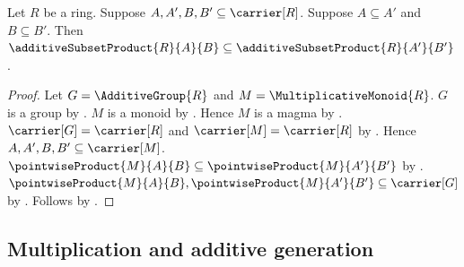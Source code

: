 \begin{proposition}\label{additive_subset_product_monotone}
    Let $R$ be a ring.
    Suppose $A,A',B,B'\subseteq\carrier[R]$.
    Suppose $A\subseteq A'$ and $B\subseteq B'$.
    Then $\additiveSubsetProduct{R}{A}{B}
        \subseteq\additiveSubsetProduct{R}{A'}{B'}$.
\end{proposition}
\begin{proof}
    Let $G=\AdditiveGroup{R}$ and $M=\MultiplicativeMonoid{R}$.
    $G$ is a group by .
    $M$ is a monoid by .
    Hence $M$ is a magma by .
    $\carrier[G]=\carrier[R]$ and $\carrier[M]=\carrier[R]$ by
        .
    Hence $A,A',B,B'\subseteq\carrier[M]$.
    $\pointwiseProduct{M}{A}{B}
        \subseteq\pointwiseProduct{M}{A'}{B'}$ by
        .
    $\pointwiseProduct{M}{A}{B},
        \pointwiseProduct{M}{A'}{B'}\subseteq\carrier[G]$ by
        .
    Follows by
        .
\end{proof}

\subsection{Multiplication and additive generation}

